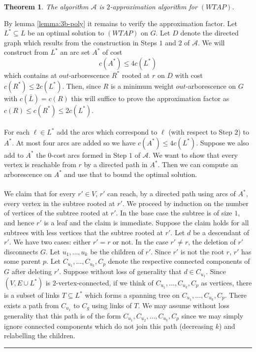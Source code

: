 \documentclass[letterpaper,12pt,oneside,onecolumn]{article}
\newcommand{\cA}{\mathcal{A}} \newcommand{\cB}{\mathcal{B}}
\newenvironment{proof}{{\bf Proof:  }}{\hfill\rule{2mm}{2mm}}
\newtheorem{theorem}[fact]{Theorem}
\begin{document}
\begin{theorem}
The algorithm $\cA$ is $2$-approximation algorithm for $(WTAP)$.
\end{theorem}
\begin{proof}
By lemma \ref{lemma:3b-poly} it remains to verify the approximation factor. Let $L^* \subseteq L$ be an optimal solution to $(WTAP)$ on $G$. Let $D$ denote the directed graph which results from the construction in Steps $1$ and $2$ of $\cA$. We will construct from $L^*$ an arc set $A^*$ of cost
$$c(A^*)\leq 4c(L^*)$$
which contains at $out$-arborescence $R^*$ rooted at $r$ on $D$ with cost $c(R^*) \leq 2c(L^*)$.
Then, since $R$ is a minimum weight $out$-arborescence on $G$ with $c(\bar{L}) = c(R)$ this will suffice to prove the approximation factor as $c(R) \leq c(R^*) \leq 2c(L^*)$.
\paragraph{}
For each $\ell \in L^*$ add the arcs which correspond to $\ell$ (with respect to Step $2$) to $A^*$. At most four arcs are added so we have $c(A^*) \leq 4c(L^*)$. Suppose we also add to $A^*$ the $0$-cost arcs formed in Step $1$ of $\cA$. We want to show that every vertex is reachable from $r$ by a directed path in $A^*$. Then we can compute an arborescence on $A^*$ and use that to bound the optimal solution.
\paragraph{}
We claim that for every $r' \in V$, $r'$ can reach, by a directed path using arcs of $A^*$, every vertex in the subtree rooted at $r'$. We proceed by induction on the number of vertices of the subtree rooted at $r'$. In the base case the subtree is of size $1$, and hence $r'$ is a leaf and the claim is immediate. Suppose the claim holds for all subtrees with less vertices that the subtree rooted at $r'$. Let $d$ be a descendant of $r'$. We have two cases: either $r' = r$ or not. In the case $r'\neq r$, the deletion of $r'$ disconnects $G$. Let $u_1, \dots, u_k$ be the children of $r'$. Since $r'$ is not the root $r$, $r'$ has some parent $p$. Let $C_{u_1}, \dots, C_{u_k}, C_p$ denote the respective connected components of $G$ after deleting $r'$. Suppose without loss of generality that $d \in C_{u_1}$. Since $(V, E \cup L^*)$ is $2$-vertex-connected, if we think of $C_{u_1}, \dots, C_{u_k}, C_p$ as vertices, there is a subset of links $T \subseteq L^*$ which forms a spanning tree on $C_{u_1}, \dots, C_{u_k}, C_p$. There exists a path from $C_{u_1}$ to $C_g$  using links of $T$. We may assume without loss generality that this path is of the form $C_{u_1}, C_{u_2}, \dots, C_{u_k}, C_p$ since we may simply ignore connected components which do not join this path (decreasing $k$) and relabelling the children.  

\end{proof}
\end{document}
